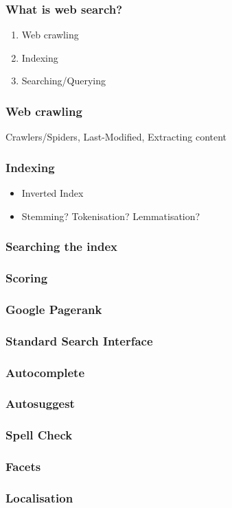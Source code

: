 \documentclass{beamer}
\begin{document}
\begin{frame}
  \frametitle{What is web search?}
  \begin{enumerate}
    \item Web crawling
    \item Indexing
    \item Searching/Querying
  \end{enumerate}
\end{frame}

\begin{frame}
  \frametitle{Web crawling}
  Crawlers/Spiders, Last-Modified, Extracting content
\end{frame}

\begin{frame}
  \frametitle{Indexing}
  \begin{itemize}
  \item Inverted Index
  \item Stemming? Tokenisation? Lemmatisation?
  \end{itemize}
\end{frame}

\begin{frame}
  \frametitle{Searching the index}
\end{frame}

\begin{frame}
  \frametitle{Scoring}
\end{frame}

\begin{frame}
  \frametitle{Google Pagerank}
\end{frame}

\begin{frame}
  \frametitle{Standard Search Interface}
\end{frame}

\begin{frame}
  \frametitle{Autocomplete}
\end{frame}

\begin{frame}
  \frametitle{Autosuggest}
\end{frame}

\begin{frame}
  \frametitle{Spell Check}
\end{frame}

\begin{frame}
  \frametitle{Facets}
\end{frame}

\begin{frame}
  \frametitle{Localisation}
\end{frame}
\end{document}

